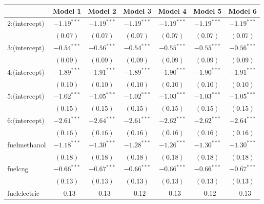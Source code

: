 
\begin{table}
\tiny
\begin{center}
\begin{tabular}{l c c c c c c }
\hline
 & Model 1 & Model 2 & Model 3 & Model 4 & Model 5 & Model 6 \\
\hline
2:(intercept)   & $-1.19^{***}$ & $-1.19^{***}$ & $-1.19^{***}$ & $-1.19^{***}$ & $-1.19^{***}$ & $-1.19^{***}$ \\
                & $(0.07)$      & $(0.07)$      & $(0.07)$      & $(0.07)$      & $(0.07)$      & $(0.07)$      \\
3:(intercept)   & $-0.54^{***}$ & $-0.56^{***}$ & $-0.54^{***}$ & $-0.55^{***}$ & $-0.55^{***}$ & $-0.56^{***}$ \\
                & $(0.09)$      & $(0.09)$      & $(0.09)$      & $(0.09)$      & $(0.09)$      & $(0.09)$      \\
4:(intercept)   & $-1.89^{***}$ & $-1.91^{***}$ & $-1.89^{***}$ & $-1.90^{***}$ & $-1.90^{***}$ & $-1.91^{***}$ \\
                & $(0.10)$      & $(0.10)$      & $(0.10)$      & $(0.10)$      & $(0.10)$      & $(0.10)$      \\
5:(intercept)   & $-1.02^{***}$ & $-1.05^{***}$ & $-1.02^{***}$ & $-1.03^{***}$ & $-1.03^{***}$ & $-1.05^{***}$ \\
                & $(0.15)$      & $(0.15)$      & $(0.15)$      & $(0.15)$      & $(0.15)$      & $(0.15)$      \\
6:(intercept)   & $-2.61^{***}$ & $-2.64^{***}$ & $-2.61^{***}$ & $-2.62^{***}$ & $-2.62^{***}$ & $-2.64^{***}$ \\
                & $(0.16)$      & $(0.16)$      & $(0.16)$      & $(0.16)$      & $(0.16)$      & $(0.16)$      \\
fuelmethanol    & $-1.18^{***}$ & $-1.30^{***}$ & $-1.28^{***}$ & $-1.26^{***}$ & $-1.30^{***}$ & $-1.30^{***}$ \\
                & $(0.18)$      & $(0.18)$      & $(0.18)$      & $(0.18)$      & $(0.18)$      & $(0.18)$      \\
fuelcng         & $-0.66^{***}$ & $-0.67^{***}$ & $-0.66^{***}$ & $-0.66^{***}$ & $-0.66^{***}$ & $-0.67^{***}$ \\
                & $(0.13)$      & $(0.13)$      & $(0.13)$      & $(0.13)$      & $(0.13)$      & $(0.13)$      \\
fuelelectric    & $-0.13$       & $-0.13$       & $-0.12$       & $-0.13$       & $-0.12$       & $-0.13$       \\

\end{tabular}
\end{center}
\end{table}
